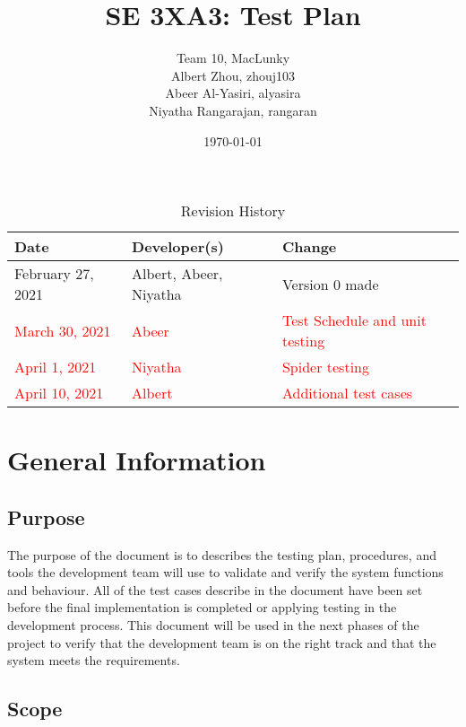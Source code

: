 \documentclass[12pt, titlepage]{article}
\title{SE 3XA3: Test Plan}
\author{Team 10, MacLunky
		\\ Albert Zhou, zhouj103
		\\Abeer Al-Yasiri, alyasira
		\\ Niyatha Rangarajan, rangaran
}
\date{\today}
\begin{document}
\maketitle

\tableofcontents
\listoftables
\listoffigures

\begin{table}[hp]
\caption{Revision History} \label{TblRevisionHistory}
\begin{tabularx}{\textwidth}{llX}
\toprule
\textbf{Date} & \textbf{Developer(s)} & \textbf{Change}\\
\midrule
February 27, 2021 & Albert, Abeer, Niyatha & Version 0 made\\
\textcolor{red}{March 30, 2021} & \textcolor{red}{Abeer}& \textcolor{red}{Test Schedule and unit testing}\\
\textcolor{red}{April 1, 2021} & \textcolor{red}{Niyatha} & \textcolor{red}{Spider testing}\\
\textcolor{red}{April 10, 2021} & \textcolor{red}{Albert} & \textcolor{red}{Additional test cases}\\
\bottomrule
\end{tabularx}
\end{table}


\newpage



\section{General Information}

\subsection{Purpose}

The purpose of the document is to describes the testing plan, procedures, and tools the development team will use to validate and verify the system functions and behaviour. All of the test cases describe in the document have been set before the final implementation is completed or applying testing in the development process. This document will be used in the next phases of the project to verify that the development team is on the right track and that the system meets the requirements.

\subsection{Scope}
\end{document}
